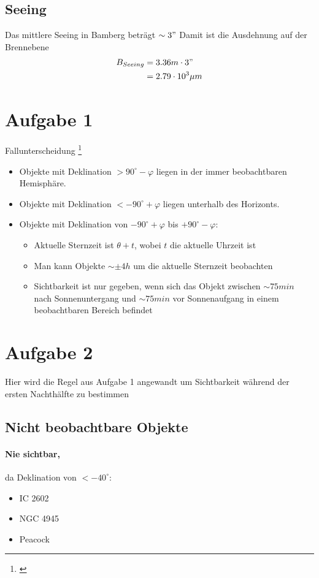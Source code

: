 \documentclass[titlepage]{scrartcl}
\begin{document}
\subsection{Seeing}
Das mittlere Seeing in Bamberg beträgt $\sim3 "$ 
Damit ist die Ausdehnung auf der Brennebene
\begin{align*}
B_{Seeing}&=3.36m \cdot 3"\\
&= 2.79 \cdot 10^3 \mu m
\end{align*}
\section{Aufgabe 1}
\label{aufgabe-1}
Fallunterscheidung \footnote{\cite{kmann}}
\begin{itemize}
\item Objekte mit Deklination  $> 90^\circ - \varphi$ liegen in der immer beobachtbaren Hemisphäre.
\item Objekte mit Deklination $< - 90^\circ + \varphi$ liegen unterhalb des Horizonts.
\item Objekte mit Deklination von $-90^\circ + \varphi$ bis $+90^\circ - \varphi$:
\begin{itemize}
\item Aktuelle Sternzeit ist $\theta + t$, wobei $t$ die aktuelle Uhrzeit ist
\item Man kann Objekte $\sim\pm 4 h$ um die aktuelle Sternzeit beobachten
\item Sichtbarkeit ist nur gegeben, wenn sich das Objekt zwischen $\sim 75 min$ nach Sonnenuntergang und $\sim 75 min$ vor Sonnenaufgang in einem beobachtbaren Bereich befindet
\end{itemize}
\end{itemize}
\section{Aufgabe 2}
Hier wird die Regel aus Aufgabe 1 angewandt um Sichtbarkeit während der ersten Nachthälfte zu bestimmen
\subsection{Nicht beobachtbare Objekte}
\paragraph{Nie sichtbar,} da Deklination von $<-40^\circ$:
\begin{itemize}
\item IC 2602
\item NGC 4945
\item Peacock
\end{itemize}
\end{document}
